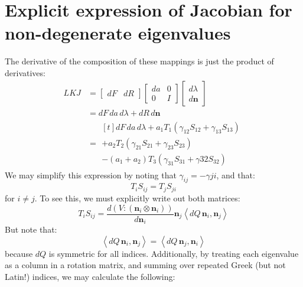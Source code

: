 \documentclass[reqno]{article}
\begin{document}
\section{Explicit expression of Jacobian for non-degenerate eigenvalues}
The derivative of the composition of these mappings is just the product of derivatives:
\begin{equation}
    \begin{split}
    LKJ
    &=
    \begin{bmatrix}
        dF &dR
    \end{bmatrix}
    \begin{bmatrix}
        da &0 \\
        0 &I
    \end{bmatrix}
    \begin{bmatrix}
        d \lambda \\
        d \mathbf{n}
    \end{bmatrix} \\
    &=
    dF \, da \, d\lambda
    + dR \, d\mathbf{n} \\
    &=
        \begin{multlined}[t]
    dF \, da \, d\lambda
        + a_1 T_1 \left( \gamma_{12} S_{12} + \gamma_{13} S_{13} \right) \\
        + a_2 T_2 \left( \gamma_{21} S_{21} + \gamma_{23} S_{23} \right) \\
        - (a_1 + a_2) T_3 \left( \gamma_{31} S_{31} + \gamma{32} S_{32} \right)
        \end{multlined}
    \end{split}
\end{equation}
We may simplify this expression by noting that $\gamma_{ij} = -\gamma{ji}$, and that:
\begin{equation}
    T_i S_{ij}
    =
    T_j S_{ji}
\end{equation}
for $i \neq j$.
To see this, we must explicitly write out both matrices:
\begin{equation}
    T_i S_{ij}
    =
    \frac{d \left( V : \left( \mathbf{n}_i \otimes \mathbf{n}_i \right) \right)}{d \mathbf{n}_i}
    \mathbf{n}_j \left< dQ \, \mathbf{n}_i, \mathbf{n}_j \right>
\end{equation}
But note that:
\begin{equation}
    \left< dQ \, \mathbf{n}_i, \mathbf{n}_j \right>
    =
    \left< dQ \, \mathbf{n}_j, \mathbf{n}_i \right>
\end{equation}
because $dQ$ is symmetric for all indices.
Additionally, by treating each eigenvalue as a column in a rotation matrix, and summing over repeated Greek (but not Latin!) indices, we may calculate the following:
\end{document}

